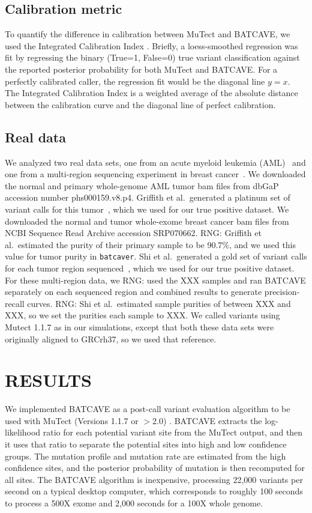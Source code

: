 \documentclass[a4,center,fleqn]{NAR}
\newcommand{\rngcomment}[1]{{\color{red}RNG: #1}}
\newcommand{\batcave}{BATCAVE\xspace}
\begin{document}
\subsection{Calibration metric}
To quantify the difference in calibration between MuTect and \batcave, we used the Integrated Calibration Index \cite{Austin2019}.
Briefly, a loess-smoothed regression was fit by regressing the binary (True=1, False=0) true variant classification against the reported posterior probability for both MuTect and \batcave.
For a perfectly calibrated caller, the regression fit would be the diagonal line $y=x$. 
The Integrated Calibration Index is a weighted average of the absolute distance between the calibration curve and the diagonal line of perfect calibration.

\subsection{Real data}
We analyzed two real data sets, one from an acute myeloid leukemia (AML)~\cite{Griffith2015} and one from a multi-region sequencing experiment in breast cancer~\cite{Shi2018}.
We downloaded the normal and primary whole-genome AML tumor bam files from dbGaP accession number phs000159.v8.p4.
Griffith et al.\ generated a platinum set of variant calls for this tumor~\cite{Griffith2015}, which we used for our true positive dataset.
We downloaded the normal and tumor whole-exome breast cancer bam files from NCBI Sequence Read Archive accession SRP070662.
\rngcomment{Griffith et al.\ estimated the purity of their primary sample to be 90.7\%, and we used this value for tumor purity in \texttt{batcaver}.}
Shi et al.\ generated a gold set of variant calls for each tumor region sequenced~\cite{Shi2018}, which we used for our true positive dataset.
For these multi-region data, we \rngcomment{used the XXX samples} and ran \batcave separately on each sequenced region and combined results to generate precision-recall curves.
\rngcomment{Shi et al.\ estimated sample purities of between XXX and XXX, so we set the purities each sample to XXX.}
We called variants using Mutect 1.1.7 as in our simulations, except that both these data sets were originally aligned to GRCrh37, so we used that reference.


\section{RESULTS}
We implemented \batcave as a post-call variant evaluation algorithm to be used with MuTect (Versions 1.1.7 or $>$2.0) \cite{Cibulskis2013}.
\batcave extracts the log-likelihood ratio for each potential variant site from the MuTect output, and then it uses that ratio to separate the potential sites into high and low confidence groups.
The mutation profile and mutation rate are estimated from the high confidence sites, and the posterior probability of mutation is then recomputed for all sites.
The \batcave algorithm is inexpensive, processing 22,000 variants per second on a typical desktop computer, which corresponds to roughly 100 seconds to process a 500X exome and 2,000 seconds for a 100X whole genome.
\end{document}
